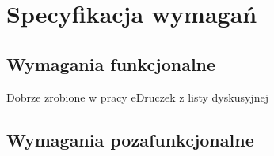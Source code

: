 \chapter{Specyfikacja wymagań}
\section{Wymagania funkcjonalne}
Dobrze zrobione w pracy eDruczek z listy dyskusyjnej
\section{Wymagania pozafunkcjonalne}

